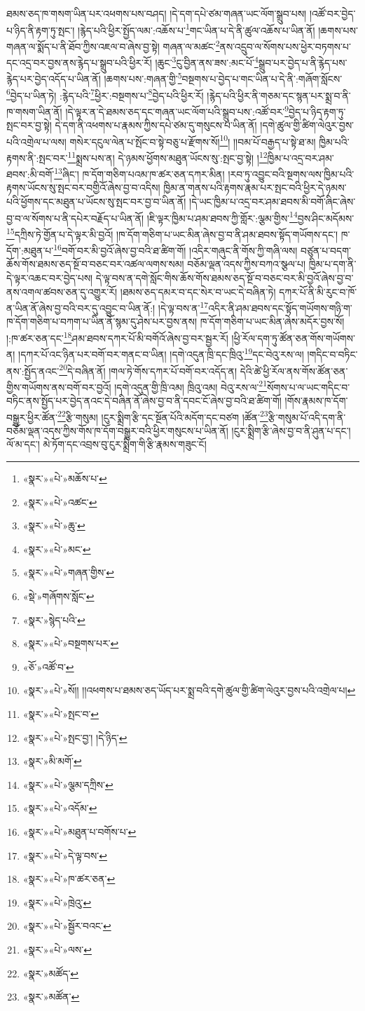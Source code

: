 ཐམས་ཅད་ཁ་གསག་ཡིན་པར་འཕགས་པས་བཤད། །དེ་དག་དཔེ་ཙམ་གཞན་ཡང་ལོག་སྒྲུབ་པས། །འཚོ་བར་བྱེད་པ་ཉིད་ནི་རྟག་ཏུ་སྤང་། །རྙེད་པའི་ཕྱིར་སྤྱོད་ལམ་:འཆོས་པ་\footnote{«སྣར་»«པེ་»མཆོས་པ་}གང་ཡིན་པ་དེ་ནི་ཚུལ་འཆོས་པ་ཡིན་ནོ། །ཆགས་པས་གཞན་ལ་སྨོད་པ་ནི་ཐོབ་ཀྱིས་འཇལ་བ་ཞེས་བྱ་སྟེ། གཞན་ལ་མཚང་\footnote{«སྣར་»«པེ་»འཚང་}ནས་འདྲུབ་ལ་སོགས་པས་ཕྱེར་བཏགས་པ་དང་འདྲ་བར་བྱས་ནས་རྙེད་པ་སྒྲུབ་པའི་ཕྱིར་རོ། །ཆུང་\footnote{«སྣར་»«པེ་»ཆུ་}ངུ་བྱིན་ནས་ཟས་:མང་པོ་\footnote{«སྣར་»«པེ་»མང་}སྒྲུབ་པར་བྱེད་པ་ནི་རྙེད་པས་རྙེད་པར་བྱེད་འདོད་པ་ཡིན་ནོ། །ཆགས་པས་:གཞན་གྱི་\footnote{«སྣར་»«པེ་»གཞན་གྱིས་}བསྔགས་པ་བྱེད་པ་གང་ཡིན་པ་དེ་ནི་:གཞོག་སློངས་\footnote{«སྡེ་»གཞོགས་སློང་}བྱེད་པ་ཡིན་ཏེ། :རྙེད་པའི་\footnote{«སྣར་»སྙེད་པའི་}ཕྱིར་:བསྔགས་པ་\footnote{«སྣར་»«པེ་»བསྔགས་པར་}བྱེད་པའི་ཕྱིར་རོ། །རྙེད་པའི་ཕྱིར་ནི་གཅམ་དང་སྙན་པར་སྨྲ་བ་ནི་ཁ་གསག་ཡིན་ནོ། །དེ་ལྟར་ན་དེ་ཐམས་ཅད་དང་གཞན་ཡང་ལོག་པའི་སྒྲུབ་པས་:འཚོ་བར་\footnote{«ཅོ་»འཚོ་བ་}བྱེད་པ་ཉིད་རྟག་ཏུ་སྤང་བར་བྱ་སྟེ། དེ་དག་ནི་འཕགས་པ་རྣམས་ཀྱིས་དཔེ་ཙམ་དུ་གསུངས་པ་ཡིན་ནོ། །དགེ་ཚུལ་གྱི་ཚིག་ལེའུར་བྱས་པའི་འགྲེལ་པ་ལས། གསེར་དངུལ་ལེན་པ་སྤོང་བ་སྟེ་བཅུ་པ་རྫོགས་སོ།\footnote{«སྣར་»«པེ་»སོ།། །།འཕགས་པ་ཐམས་ཅད་ཡོད་པར་སྨྲ་བའི་དགེ་ཚུལ་གྱི་ཚིག་ལེའུར་བྱས་པའི་འགྲེལ་པ།}། །།བམ་པོ་བརྒྱད་པ་སྟེ་ཐ་མ། ཁྱིམ་པའི་རྟགས་ནི་:སྤང་བར་\footnote{«སྣར་»«པེ་»སྤང་བ་}སྨྲས་པས་ན། དེ་ཉམས་ཕྱོགས་མཐུན་ཡོངས་སུ་:སྤང་བྱ་སྟེ། །\footnote{«སྣར་»«པེ་»སྤང་བྱ་། །དེ་ཉིད་}ཁྱིམ་པ་འདྲ་བར་ཤམ་ཐབས་:མི་བགོ་\footnote{«སྣར་»མི་མགོ་}ཞིང་། ཁ་དོག་གཅིག་པའམ་ཁ་ཚར་ཅན་དཀར་མིན། །རབ་ཏུ་འབྱུང་བའི་སྔགས་ལས་ཁྱིམ་པའི་རྟགས་ཡོངས་སུ་སྤང་བར་བགྱིའོ་ཞེས་བྱ་བ་འདིས། ཁྱིམ་ན་གནས་པའི་རྟགས་རྣམ་པར་སྤང་བའི་ཕྱིར་དེ་ཉམས་པའི་ཕྱོགས་དང་མཐུན་པ་ཡོངས་སུ་སྤང་བར་བྱ་བ་ཡིན་ནོ། །དེ་ཡང་ཁྱིམ་པ་འདྲ་བར་ཤམ་ཐབས་མི་བགོ་ཞིང་ཞེས་བྱ་བ་ལ་སོགས་པ་ནི་དཔེར་བརྗོད་པ་ཡིན་ནོ། །ཇི་ལྟར་ཁྱིམ་པ་ཤམ་ཐབས་ཀྱི་གློར་:ལྕམ་གྱིས་\footnote{«སྣར་»«པེ་»ལྕམ་དཀྲིས་}བྱས་ཤིང་མདོམས་\footnote{«སྣར་»«པེ་»འདོམ་}དཀྲིས་ཏེ་གྱོན་པ་དེ་ལྟར་མི་བྱའོ། །ཁ་དོག་གཅིག་པ་ཡང་མིན་ཞེས་བྱ་བ་ནི་ཤམ་ཐབས་སྟོད་གཡོགས་དང་། ཁ་དོག་:མཐུན་པ་\footnote{«སྣར་»«པེ་»མཐུན་པ་བགོས་པ་}བགོ་བར་མི་བྱའོ་ཞེས་བྱ་བའི་ཐ་ཚིག་གོ། །འདིར་གཞུང་ནི་གོས་ཀྱི་གཞི་ལས། བཙུན་པ་བདག་ཆོས་གོས་ཐམས་ཅད་སྔོ་བ་བཅང་བར་འཚལ་ལགས་སམ། བཅོམ་ལྡན་འདས་ཀྱིས་བཀའ་སྩལ་པ། ཁྱིམ་པ་དག་ནི་དེ་ལྟར་འཆང་བར་བྱེད་པས། དེ་ལྟ་བས་ན་དགེ་སློང་གིས་ཆོས་གོས་ཐམས་ཅད་སྔོ་བ་བཅང་བར་མི་བྱའོ་ཞེས་བྱ་བ་ནས་འགལ་ཚབས་ཅན་དུ་འགྱུར་རོ། །ཐམས་ཅད་དམར་བ་དང་སེར་བ་ཡང་དེ་བཞིན་ཏེ། དཀར་པོ་ནི་མི་རུང་བ་ཁོ་ན་ཡིན་ནོ་ཞེས་བྱ་བའི་བར་དུ་འབྱུང་བ་ཡིན་ནོ:། །དེ་ལྟ་བས་ན་\footnote{«སྣར་»«པེ་»དེ་ལྟ་བས་}འདིར་ནི་ཤམ་ཐབས་དང་སྟོད་གཡོགས་གཉི་ག་ཁ་དོག་གཅིག་པ་བཀག་པ་ཡིན་ནོ་སྙམ་དུ་ཤེས་པར་བྱས་ནས། ཁ་དོག་གཅིག་པ་ཡང་མིན་ཞེས་མདོར་བྱས་སོ། །:ཁ་ཚར་ཅན་དང་\footnote{«སྣར་»«པེ་»ཁ་ཚར་ཅན་}ཤམ་ཐབས་དཀར་པོ་མི་བགོའོ་ཞེས་བྱ་བར་སྦྱར་རོ། །ཕྱི་རོལ་དག་ཏུ་ཚོན་ཅན་གོས་གཡོགས་ན། །དཀར་པོ་འང་ཉིན་པར་བགོ་བར་གནང་བ་ཡིན། །དགེ་འདུན་ཁྲི་དང་ཁྲིའུ་\footnote{«སྣར་»«པེ་»ཁྲེའུ་}དང་བེའུ་རས་ལ། །གདིང་བ་བཏིང་ནས་:སྤྱོད་ནའང་\footnote{«སྣར་»«པེ་»སྦྱོར་བའང་}དེ་བཞིན་ནོ། །གལ་ཏེ་གོས་དཀར་པོ་བགོ་བར་འདོད་ན། དེའི་ཚེ་ཕྱི་རོལ་ནས་གོས་ཚོན་ཅན་གྱིས་གཡོགས་ནས་བགོ་བར་བྱའོ། །དགེ་འདུན་གྱི་ཁྲི་འམ། ཁྲིའུ་འམ། བེའུ་རས་ལ་\footnote{«སྣར་»«པེ་»ལས་}སོགས་པ་ལ་ཡང་གདིང་བ་བཏིང་ནས་སྤྱོད་པར་བྱེད་ནའང་དེ་བཞིན་ནོ་ཞེས་བྱ་བ་ནི་དབང་ངོ་ཞེས་བྱ་བའི་ཐ་ཚིག་གོ། །གོས་རྣམས་ཁ་དོག་བསྒྱུར་ཕྱིར་ཚོན་\footnote{«སྣར་»མཚོད་}རྩི་གསུམ། །ངུར་སྨྲིག་རྩི་དང་སྔོན་པོའི་མདོག་དང་བཙག །ཚོན་\footnote{«སྣར་»མཚོན་}རྩི་གསུམ་པོ་འདི་དག་ནི་བཅོམ་ལྡན་འདས་ཀྱིས་གོས་ཁ་དོག་བསྒྱུར་བའི་ཕྱིར་གསུངས་པ་ཡིན་ནོ། །ངུར་སྨྲིག་རྩི་ཞེས་བྱ་བ་ནི་ཤུན་པ་དང་། ལོ་མ་དང་། མེ་ཏོག་དང་འབྲས་བུ་ངུར་སྨྲིག་གི་རྩི་རྣམས་གཟུང་ངོ། 